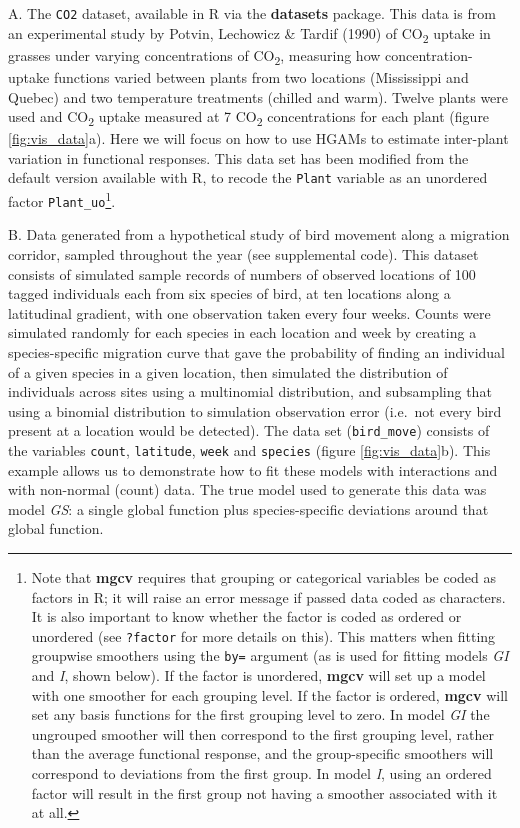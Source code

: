 \documentclass[12pt]{article}
\let\rmarkdownfootnote\footnote%
\def\footnote{\protect\rmarkdownfootnote}
\begin{document}
A. The \texttt{CO2} dataset, available in R via the \textbf{datasets}
package. This data is from an experimental study by Potvin, Lechowicz \&
Tardif (1990) of CO\textsubscript{2} uptake in grasses under varying
concentrations of CO\textsubscript{2}, measuring how
concentration-uptake functions varied between plants from two locations
(Mississippi and Quebec) and two temperature treatments (chilled and
warm). Twelve plants were used and CO\textsubscript{2} uptake measured
at 7 CO\textsubscript{2} concentrations for each plant (figure
\ref{fig:vis_data}a). Here we will focus on how to use HGAMs to estimate
inter-plant variation in functional responses. This data set has been
modified from the default version available with R, to recode the
\texttt{Plant} variable as an unordered factor
\texttt{Plant\_uo}\footnote{Note that \textbf{mgcv} requires that
  grouping or categorical variables be coded as factors in R; it will
  raise an error message if passed data coded as characters. It is also
  important to know whether the factor is coded as ordered or unordered
  (see \texttt{?factor} for more details on this). This matters when
  fitting groupwise smoothers using the \texttt{by=} argument (as is
  used for fitting models \emph{GI} and \emph{I}, shown below). If the
  factor is unordered, \textbf{mgcv} will set up a model with one
  smoother for each grouping level. If the factor is ordered,
  \textbf{mgcv} will set any basis functions for the first grouping
  level to zero. In model \emph{GI} the ungrouped smoother will then
  correspond to the first grouping level, rather than the average
  functional response, and the group-specific smoothers will correspond
  to deviations from the first group. In model \emph{I}, using an
  ordered factor will result in the first group not having a smoother
  associated with it at all.}.

B. Data generated from a hypothetical study of bird movement along a
migration corridor, sampled throughout the year (see supplemental code).
This dataset consists of simulated sample records of numbers of observed
locations of 100 tagged individuals each from six species of bird, at
ten locations along a latitudinal gradient, with one observation taken
every four weeks. Counts were simulated randomly for each species in
each location and week by creating a species-specific migration curve
that gave the probability of finding an individual of a given species in
a given location, then simulated the distribution of individuals across
sites using a multinomial distribution, and subsampling that using a
binomial distribution to simulation observation error (i.e.~not every
bird present at a location would be detected). The data set
(\texttt{bird\_move}) consists of the variables \texttt{count},
\texttt{latitude}, \texttt{week} and \texttt{species} (figure
\ref{fig:vis_data}b). This example allows us to demonstrate how to fit
these models with interactions and with non-normal (count) data. The
true model used to generate this data was model \emph{GS}: a single
global function plus species-specific deviations around that global
function.
\end{document}
